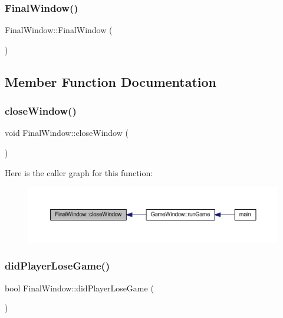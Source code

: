 \subsubsection{\texorpdfstring{Final\+Window()}{FinalWindow()}}
{\footnotesize\ttfamily Final\+Window\+::\+Final\+Window (\begin{DoxyParamCaption}{ }\end{DoxyParamCaption})}



\subsection{Member Function Documentation}
\mbox{\label{class_final_window_a3c5b82cb988e1f312c0f459959442e2b}} 
\subsubsection{\texorpdfstring{close\+Window()}{closeWindow()}}
{\footnotesize\ttfamily void Final\+Window\+::close\+Window (\begin{DoxyParamCaption}{ }\end{DoxyParamCaption})}

Here is the caller graph for this function\+:\nopagebreak
\begin{figure}[H]
\begin{center}
\leavevmode
\includegraphics[width=350pt]{class_final_window_a3c5b82cb988e1f312c0f459959442e2b_icgraph}
\end{center}
\end{figure}
\mbox{\label{class_final_window_a793b0fa86eac2eef3256d9d2f1f3711b}} 
\subsubsection{\texorpdfstring{did\+Player\+Lose\+Game()}{didPlayerLoseGame()}}
{\footnotesize\ttfamily bool Final\+Window\+::did\+Player\+Lose\+Game (\begin{DoxyParamCaption}{ }\end{DoxyParamCaption})}


